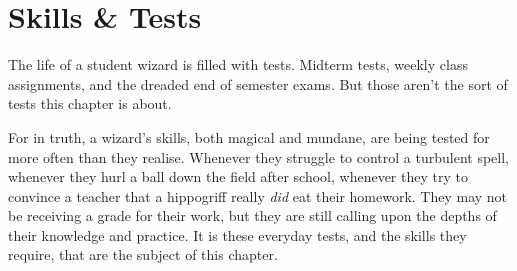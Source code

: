 \chapter{Skills \& Tests}

The life of a student wizard is filled with tests.
Midterm tests, weekly class assignments, and the dreaded end of semester exams.
But those aren't the sort of tests this chapter is about.

For in truth, a wizard's skills, both magical and mundane, are being tested for more often than they realise.
Whenever they struggle to control a turbulent spell,
whenever they hurl a ball down the field after school,
whenever they try to convince a teacher that a hippogriff really \emph{did} eat their homework.
They may not be receiving a grade for their work, but they are still calling upon the depths of their knowledge and practice.
It is these everyday tests, and the skills they require, that are the subject of this chapter.

